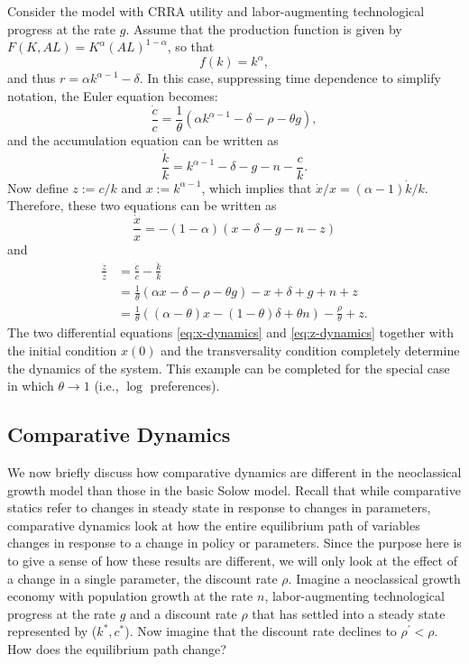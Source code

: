 \documentclass[\topdir/lecture\_notes.tex]{subfiles}
\begin{document}
\begin{example}
  Consider the model with CRRA utility and labor-augmenting technological progress at the rate \(g\). Assume that the production function is given by \(F(K, A L)= K^{\alpha}(A L)^{1-\alpha}\), so that
  \[
    f(k)=k^{\alpha},
  \]
  and thus \(r=\alpha k^{\alpha-1}-\delta\). In this case, suppressing time dependence to simplify notation, the Euler equation becomes:
  \[
    \frac{\dot{c}}{c}=\frac{1}{\theta}\left(\alpha k^{\alpha-1}-\delta-\rho-\theta g\right),
  \]
  and the accumulation equation can be written as
  \[
    \frac{\dot{k}}{k}=k^{\alpha-1}-\delta-g-n-\frac{c}{k}.
  \]
  Now define \(z := c / k\) and \(x := k^{\alpha-1}\), which implies that \(\dot{x} / x=(\alpha-1) \dot{k} / k\). Therefore, these two equations can be written as
  \begin{equation}
    \frac{\dot{x}}{x}=-(1-\alpha)(x-\delta-g-n-z) \label{eq:x-dynamics}
  \end{equation}
  and
  \begin{equation}
    \begin{aligned}
      \frac{\dot{z}}{z} & = \frac{\dot{c}}{c}-\frac{\dot{k}}{k}                                                 \\
                        & =\frac{1}{\theta}(\alpha x-\delta-\rho-\theta g)-x+\delta+g+n+z                       \\
                        & =\frac{1}{\theta}((\alpha-\theta) x-(1-\theta) \delta+\theta n)-\frac{\rho}{\theta}+z.
    \end{aligned}
    \label{eq:z-dynamics}
  \end{equation}
  The two differential equations \eqref{eq:x-dynamics} and \eqref{eq:z-dynamics} together with the initial condition \(x(0)\) and the transversality condition completely determine the dynamics of the system. This example can be completed for the special case in which \(\theta \rightarrow 1\) (i.e., \(\log\) preferences).
\end{example}

\subsection{Comparative Dynamics}
We now briefly discuss how comparative dynamics are different in the neoclassical growth model than those in the basic Solow model. Recall that while comparative statics refer to changes in steady state in response to changes in parameters, comparative dynamics look at how the entire equilibrium path of variables changes in response to a change in policy or parameters. Since the purpose here is to give a sense of how these results are different, we will only look at the effect of a change in a single parameter, the discount rate \(\rho\). Imagine a neoclassical growth economy with population growth at the rate \(n\), labor-augmenting technological progress at the rate \(g\) and a discount rate \(\rho\) that has settled into a steady state
represented by (\(k^{*}, c^{*}\)). Now imagine that the discount rate declines to \(\rho^{\prime}<\rho\). How does the equilibrium path change?
\end{document}
